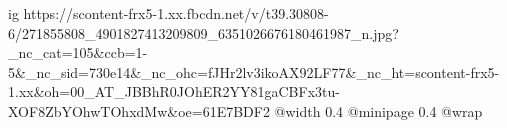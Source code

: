  
 
 
 
 

\ifcmt
  ig https://scontent-frx5-1.xx.fbcdn.net/v/t39.30808-6/271855808_4901827413209809_6351026676180461987_n.jpg?_nc_cat=105&ccb=1-5&_nc_sid=730e14&_nc_ohc=fJHr2lv3ikoAX92LF77&_nc_ht=scontent-frx5-1.xx&oh=00_AT_JBBhR0JOhER2YY81gaCBFx3tu-XOF8ZbYOhwTOhxdMw&oe=61E7BDF2
  @width 0.4
  @minipage 0.4
  @wrap \parpic[r]
\fi

